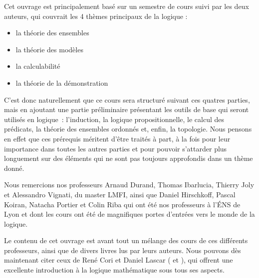 Cet ouvrage est principalement basé sur un semestre de cours suivi par les deux
auteurs, qui couvrait les 4 thèmes principaux de la logique :
\begin{itemize}
\item la théorie des ensembles
\item la théorie des modèles
\item la calculabilité
\item la théorie de la démonstration
\end{itemize}

C'est donc naturellement que ce cours sera structuré suivant ces quatres
parties, mais en ajoutant une partie préliminaire présentant les outils de base
qui seront utilisés en logique~: l'induction, la logique propositionnelle, le
calcul des prédicats, la théorie des ensembles ordonnés et, enfin, la topologie.
Nous pensons en effet que ces prérequis méritent d'être traités à part, à la
fois pour leur importance dans toutes les autres parties et pour pouvoir
s'attarder plus longuement sur des éléments qui ne sont pas toujours approfondis
dans un thème donné.

Nous remercions nos professeurs Arnaud Durand, Thomas Ibarlucia, Thierry Joly et
Alessandro Vignati, du master LMFI, ainsi que Daniel Hirschkoff, Pascal Koiran,
Natacha Portier et Colin Riba qui ont été nos professeurs à l'\'ENS de Lyon et
dont les cours ont été de magnifiques portes d'entrées vers le monde de la
logique.

Le contenu de cet ouvrage est avant tout un mélange des cours de ces différents
professeurs, ainsi que de divers livres lus par leurs auteurs. Nous pouvons dès
maintenant citer ceux de René Cori et Daniel Lascar
(\cite{cori2003logique} et \cite{cori1993logique}), qui offrent une excellente
introduction à la logique mathématique sous tous ses aspects.
